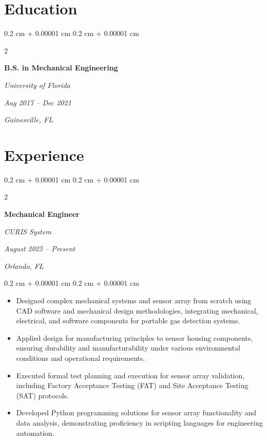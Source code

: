 \documentclass[10pt, letterpaper]{article}
\newenvironment{highlights}{
    \begin{itemize}[
        topsep=0.10 cm,
        parsep=0.10 cm,
        partopsep=0pt,
        itemsep=0pt,
        leftmargin=0.4 cm + 10pt
    ]
}{
    \end{itemize}
} %
\newenvironment{onecolentry}{
    \begin{adjustwidth}{
        0.2 cm + 0.00001 cm
    }{
        0.2 cm + 0.00001 cm
    }
}{
    \end{adjustwidth}
} %
\newenvironment{twocolentry}[2][]{
    \onecolentry
    \def\secondColumn{#2}
    \setcolumnwidth{\fill, 9.0 cm}
    \begin{paracol}{2}
}{
    \switchcolumn \raggedleft \secondColumn
    \end{paracol}
    \endonecolentry
} %
\begin{document}
        \vspace{0.3 cm}


    

    \section{Education}

\vspace{0.2 cm}
        
        \begin{twocolentry}{
            \textit{Aug 2017 – Dec 2021}
            
            \textit{Gainesville, FL}}
            \textbf{B.S. in Mechanical Engineering}
            
            \textit{University of Florida}
        \end{twocolentry}

        \vspace{0.15 cm}
        

\vspace{0.3 cm}

    
    \section{Experience}

        \vspace{0.2 cm}

        \begin{twocolentry}{
            \textit{August 2025 – Present}
            
            \textit{Orlando, FL}}
            \textbf{Mechanical Engineer}
            
            \textit{CURIS System}
        \end{twocolentry}

        \vspace{0.10 cm}
        \begin{onecolentry}
            \begin{highlights}
                \item Designed complex mechanical systems and sensor array from scratch using CAD software and mechanical design methodologies, integrating mechanical, electrical, and software components for portable gas detection systems.
                \item Applied design for manufacturing principles to sensor housing components, ensuring durability and manufacturability under various environmental conditions and operational requirements.
                \item Executed formal test planning and execution for sensor array validation, including Factory Acceptance Testing (FAT) and Site Acceptance Testing (SAT) protocols.
                \item Developed Python programming solutions for sensor array functionality and data analysis, demonstrating proficiency in scripting languages for engineering automation.
            \end{highlights}
        \end{onecolentry}
\end{document}
